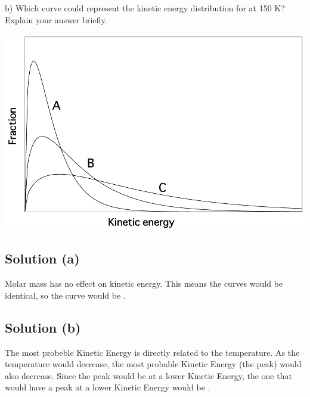 \documentclass[10pt]{article}
\begin{document}
        b) Which curve could represent the kinetic energy distribution for  at 150 K? Explain your answer briefly.

        \begin{center}
            \includegraphics[width=\textwidth]{picture_C-20.png}
        \end{center}

        \subsection{Solution (a)}
            Molar mass has no effect on kinetic energy. 
            This means the curves would be identical, so the curve would be .

        \subsection{Solution (b)}
            The most probeble Kinetic Energy is directly related to the temperature.
            As the temperature would decrease, the most probable Kinetic Energy (the peak) would also decrease.
            Since the peak would be at a lower Kinetic Energy, the one that would have a peak at a lower Kinetic Energy would be .

    \pagebreak
\end{document}
